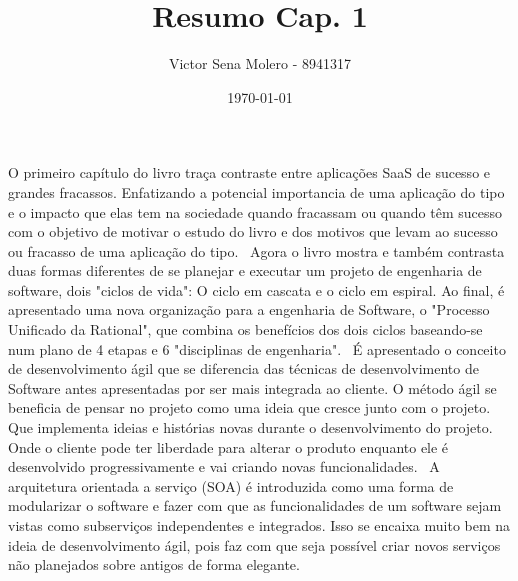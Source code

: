 \documentclass[a4paper]{article}
\title{Resumo Cap. 1}
\author{Victor Sena Molero - 8941317}
\date{\today}
\begin{document}
\maketitle

O primeiro capítulo do livro traça contraste entre aplicações SaaS de sucesso e grandes fracassos. Enfatizando a potencial importancia de uma aplicação do tipo e o impacto que elas tem na sociedade quando fracassam ou quando têm sucesso com o objetivo de motivar o estudo do livro e dos motivos que levam ao sucesso ou fracasso de uma aplicação do tipo. \ 
Agora o livro mostra e também contrasta duas formas diferentes de se planejar e executar um projeto de engenharia de software, dois "ciclos de vida": O ciclo em cascata e o ciclo em espiral. Ao final, é apresentado uma nova organização para a engenharia de Software, o "Processo Unificado da Rational", que combina os benefícios dos dois ciclos baseando-se num plano de 4 etapas e 6 "disciplinas de engenharia". \ 
É apresentado o conceito de desenvolvimento ágil que se diferencia das técnicas de desenvolvimento de Software antes apresentadas por ser mais integrada ao cliente. O método ágil se beneficia de pensar no projeto como uma ideia que cresce junto com o projeto. Que implementa ideias e histórias novas durante o desenvolvimento do projeto. Onde o cliente pode ter liberdade para alterar o produto enquanto ele é desenvolvido progressivamente e vai criando novas funcionalidades. \ 
A arquitetura orientada a serviço (SOA) é introduzida como uma forma de modularizar o software e fazer com que as funcionalidades de um software sejam vistas como subserviços independentes e integrados. Isso se encaixa muito bem na ideia de desenvolvimento ágil, pois faz com que seja possível criar novos serviços não planejados sobre antigos de forma elegante. \ 
\end{document}
